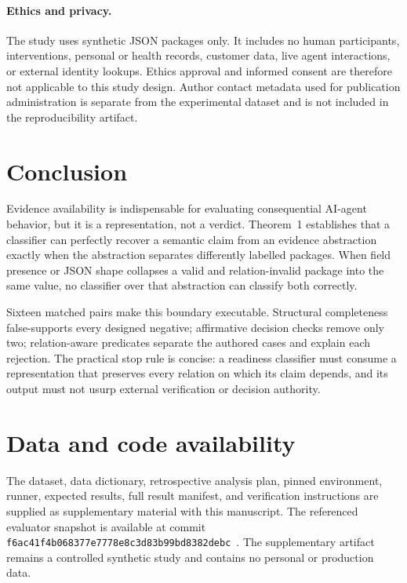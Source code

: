 \documentclass[preprint,12pt]{elsarticle}
\newcommand{\code}[1]{\texttt{#1}}
\begin{document}
\paragraph{Ethics and privacy.}
The study uses synthetic JSON packages only. It includes no human participants, interventions, personal or health records, customer data, live agent interactions, or external identity lookups. Ethics approval and informed consent are therefore not applicable to this study design. Author contact metadata used for publication administration is separate from the experimental dataset and is not included in the reproducibility artifact.

\section{Conclusion}

Evidence availability is indispensable for evaluating consequential AI-agent behavior, but it is a representation, not a verdict. Theorem~1 establishes that a classifier can perfectly recover a semantic claim from an evidence abstraction exactly when the abstraction separates differently labelled packages. When field presence or JSON shape collapses a valid and relation-invalid package into the same value, no classifier over that abstraction can classify both correctly.

Sixteen matched pairs make this boundary executable. Structural completeness false-supports every designed negative; affirmative decision checks remove only two; relation-aware predicates separate the authored cases and explain each rejection. The practical stop rule is concise: a readiness classifier must consume a representation that preserves every relation on which its claim depends, and its output must not usurp external verification or decision authority.

\section*{Data and code availability}
The dataset, data dictionary, retrospective analysis plan, pinned environment, runner, expected results, full result manifest, and verification instructions are supplied as supplementary material with this manuscript. The referenced evaluator snapshot is available at commit \code{f6ac41f4b068377e7778e8c3d83b99bd8382debc}~\cite{saee2026artifact}. The supplementary artifact remains a controlled synthetic study and contains no personal or production data.
\end{document}
